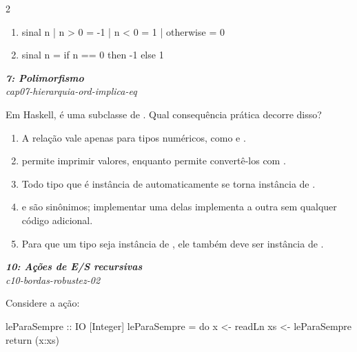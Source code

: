 \documentclass[a4paper,10pt,brazil]{article}
\begin{document}
\begin{multicols}{2}
\begin{enumerate}
  \item \begin{haskellcode}
sinal n
  | n > 0     = -1
  | n < 0     = 1
  | otherwise = 0
\end{haskellcode}

  \item \begin{haskellcode}
sinal n = if n == 0 then -1 else 1
\end{haskellcode}


\end{enumerate}

\begin{flushright}
  \footnotesize
  \textit{\textbf{7: Polimorfismo}}\\
  \textit{cap07-hierarquia-ord-implica-eq}\\

\end{flushright}
Em Haskell,  é uma subclasse de . Qual consequência prática decorre disso?
\begin{enumerate}
  \item A relação vale apenas para tipos numéricos, como  e .
  \item {} permite imprimir valores, enquanto  permite convertê-los com .
  \item Todo tipo que é instância de  automaticamente se torna instância de .
  \item {} e  são sinônimos; implementar uma delas implementa a outra sem qualquer código adicional.
  \item Para que um tipo seja instância de , ele também deve ser instância de .

\end{enumerate}

\begin{flushright}
  \footnotesize
  \textit{\textbf{10: Ações de E/S recursivas}}\\
  \textit{c10-bordas-robustez-02}\\

\end{flushright}
Considere a ação:

\begin{haskellcode}
leParaSempre :: IO [Integer]
leParaSempre = do
  x <- readLn
  xs <- leParaSempre
  return (x:xs)
\end{haskellcode}


\end{multicols}
\end{document}

